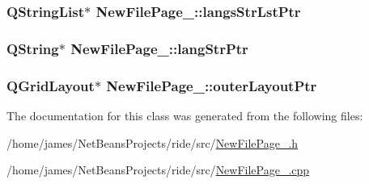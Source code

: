 \hypertarget{class_new_file_page__1_acb912634d0accb1d1fc2cb1f5c2dea78}{
\subsubsection[{langs\-Str\-Lst\-Ptr}]{\setlength{\rightskip}{0pt plus 5cm}Q\-String\-List$\ast$ New\-File\-Page\-\_\-::langs\-Str\-Lst\-Ptr\hspace{0.3cm}{\ttfamily [private]}}}\label{class_new_file_page__1_acb912634d0accb1d1fc2cb1f5c2dea78}
\hypertarget{class_new_file_page__1_a28c75fb5624badef97ed17d38f0c598a}{
\subsubsection[{lang\-Str\-Ptr}]{\setlength{\rightskip}{0pt plus 5cm}Q\-String$\ast$ New\-File\-Page\-\_\-::lang\-Str\-Ptr\hspace{0.3cm}{\ttfamily [private]}}}\label{class_new_file_page__1_a28c75fb5624badef97ed17d38f0c598a}
\hypertarget{class_new_file_page__1_a161e24cf061ed28e5ee5f61e5087a9fc}{
\subsubsection[{outer\-Layout\-Ptr}]{\setlength{\rightskip}{0pt plus 5cm}Q\-Grid\-Layout$\ast$ New\-File\-Page\-\_\-::outer\-Layout\-Ptr\hspace{0.3cm}{\ttfamily [private]}}}\label{class_new_file_page__1_a161e24cf061ed28e5ee5f61e5087a9fc}


The documentation for this class was generated from the following files\-:\begin{DoxyCompactItemize}
\item 
/home/james/\-Net\-Beans\-Projects/ride/src/\hyperlink{_new_file_page__1_8h}{New\-File\-Page\-\_.\-h}\item 
/home/james/\-Net\-Beans\-Projects/ride/src/\hyperlink{_new_file_page__1_8cpp}{New\-File\-Page\-\_.\-cpp}\end{DoxyCompactItemize}

